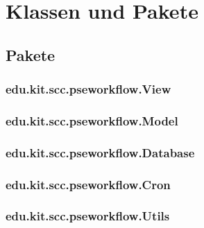 \chapter{Klassen und Pakete}

    \section{Pakete}
    
        \subsection{edu.kit.scc.pseworkflow.View}
        \subsection{edu.kit.scc.pseworkflow.Model}
        \subsection{edu.kit.scc.pseworkflow.Database}
        \subsection{edu.kit.scc.pseworkflow.Cron}
        \subsection{edu.kit.scc.pseworkflow.Utils}
        
